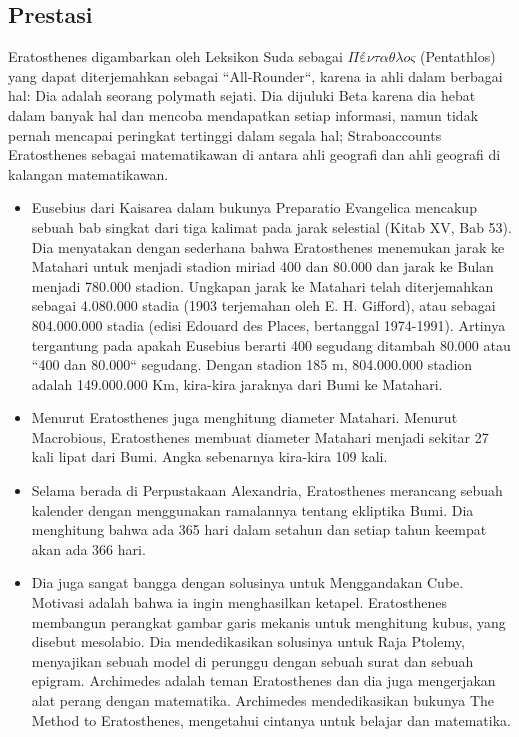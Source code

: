 \subsection{Prestasi}
Eratosthenes digambarkan oleh Leksikon Suda sebagai $Πένταθλος$ (Pentathlos) yang dapat diterjemahkan sebagai ``All-Rounder``, karena ia ahli dalam berbagai hal: Dia adalah seorang polymath sejati. Dia dijuluki Beta karena dia hebat dalam banyak hal dan mencoba mendapatkan setiap informasi, namun tidak pernah mencapai peringkat tertinggi dalam segala hal; Straboaccounts Eratosthenes sebagai matematikawan di antara ahli geografi dan ahli geografi di kalangan matematikawan.
\begin{itemize}
\item Eusebius dari Kaisarea dalam bukunya Preparatio Evangelica mencakup sebuah bab singkat dari tiga kalimat pada jarak selestial (Kitab XV, Bab 53). Dia menyatakan dengan sederhana bahwa Eratosthenes menemukan jarak ke Matahari untuk menjadi stadion miriad 400 dan 80.000 dan jarak ke Bulan menjadi 780.000 stadion. Ungkapan jarak ke Matahari telah diterjemahkan sebagai 4.080.000 stadia (1903 terjemahan oleh E. H. Gifford), atau sebagai 804.000.000 stadia (edisi Edouard des Places, bertanggal 1974-1991). Artinya tergantung pada apakah Eusebius berarti 400 segudang ditambah 80.000 atau ``400 dan 80.000`` segudang. Dengan stadion 185 m, 804.000.000 stadion adalah 149.000.000 Km, kira-kira jaraknya dari Bumi ke Matahari.
\item Menurut \cite{smith2005dictionary} Eratosthenes juga menghitung diameter Matahari. Menurut Macrobious, Eratosthenes membuat diameter Matahari menjadi sekitar 27 kali lipat dari Bumi. Angka sebenarnya kira-kira 109 kali.
\item Selama berada di Perpustakaan Alexandria, Eratosthenes merancang sebuah kalender dengan menggunakan ramalannya tentang ekliptika Bumi. Dia menghitung bahwa ada 365 hari dalam setahun dan setiap tahun keempat akan ada 366 hari.
\item Dia juga sangat bangga dengan solusinya untuk Menggandakan Cube. Motivasi adalah bahwa ia ingin menghasilkan ketapel. Eratosthenes membangun perangkat gambar garis mekanis untuk menghitung kubus, yang disebut mesolabio. Dia mendedikasikan solusinya untuk Raja Ptolemy, menyajikan sebuah model di perunggu dengan sebuah surat dan sebuah epigram. Archimedes adalah teman Eratosthenes dan dia juga mengerjakan alat perang dengan matematika. Archimedes mendedikasikan bukunya The Method to Eratosthenes, mengetahui cintanya untuk belajar dan matematika. \cite{chondros2010archimedes}
\end{itemize}
